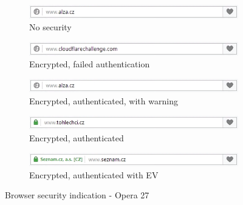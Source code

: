 \begin{figure}
  \begin{subfigure}[b]{\textwidth}
    \centering
    \includegraphics[scale=0.6]{images/browsers/o-none.png}
    \caption{No security}
  \end{subfigure}
  \begin{subfigure}[b]{\textwidth}
    \centering
    \includegraphics[scale=0.6]{images/browsers/o-untrusted.png}
    \caption{Encrypted, failed authentication}
  \end{subfigure}
  \begin{subfigure}[b]{\textwidth}
    \centering
    \includegraphics[scale=0.6]{images/browsers/o-warning.png}
    \caption{Encrypted, authenticated, with warning}
  \end{subfigure}
  \begin{subfigure}[b]{\textwidth}
    \centering
    \includegraphics[scale=0.6]{images/browsers/o-dv.png}
    \caption{Encrypted, authenticated}
  \end{subfigure}
  \begin{subfigure}[b]{\textwidth}
    \centering
    \includegraphics[scale=0.6]{images/browsers/o-ev.png}
    \caption{Encrypted, authenticated with EV}
  \end{subfigure}
  \caption{Browser security indication - Opera 27}
\end{figure}

